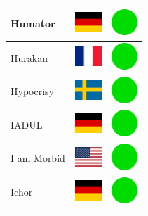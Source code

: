 \documentclass[12pt, a4paper, twoside]{report}
\begin{document}
\begin{center}
\begin{longtable}{|p{5cm}|p{2cm}|p{2cm}|}
 Humator                                                    & \includegraphics[width=1cm]{../img/flags/de} &   \includegraphics[width=1cm]{../likes/y} \\ \hline
 Hurakan                                                    & \includegraphics[width=1cm]{../img/flags/fr} &   \includegraphics[width=1cm]{../likes/y} \\ \hline
 Hypocrisy                                                  & \includegraphics[width=1cm]{../img/flags/se} &   \includegraphics[width=1cm]{../likes/y} \\ \hline
 IADUL                                                      & \includegraphics[width=1cm]{../img/flags/de} &   \includegraphics[width=1cm]{../likes/y} \\ \hline
 I am Morbid                                                & \includegraphics[width=1cm]{../img/flags/us} &   \includegraphics[width=1cm]{../likes/y} \\ \hline
 Ichor                                                      & \includegraphics[width=1cm]{../img/flags/de} &   \includegraphics[width=1cm]{../likes/y} \\ \hline

\end{longtable}
\end{center}
\end{document}
